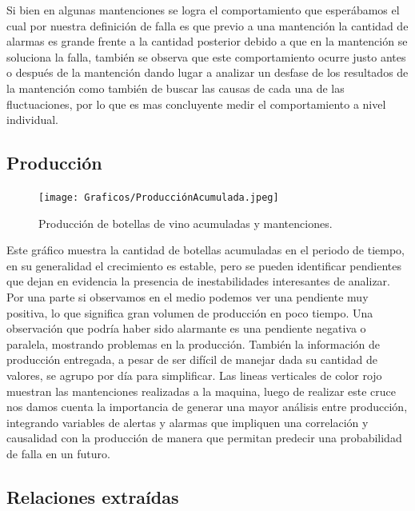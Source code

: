 \documentclass[10pt]{article}
\begin{document}
Si bien en algunas mantenciones se logra el comportamiento que esperábamos el cual por nuestra definición de falla es que previo a una mantención la cantidad de alarmas es grande frente a la cantidad posterior debido a que en la mantención se soluciona la falla, también se observa que este comportamiento ocurre justo antes o después de la mantención dando lugar a analizar un desfase de los resultados de la mantención como también de buscar las causas de cada una de las fluctuaciones, por lo que es mas concluyente medir el comportamiento a nivel individual. 


\subsection{Producción}

\begin{figure}[H]
\texttt{[image: Graficos/ProducciónAcumulada.jpeg]}
\caption{Producción de botellas de vino acumuladas y mantenciones.}
\end{figure}


Este gráfico muestra la cantidad de botellas acumuladas en el periodo de tiempo, en su generalidad el crecimiento es estable, pero se pueden identificar pendientes que dejan en evidencia la presencia de inestabilidades interesantes de analizar. Por una parte si observamos en el medio podemos ver una pendiente muy positiva, lo que significa gran volumen de producción en poco tiempo. Una observación que podría haber sido alarmante es una pendiente negativa o paralela, mostrando problemas en la producción. También la información de producción entregada, a pesar de ser difícil de manejar dada su cantidad de valores, se agrupo por día para simplificar. Las lineas verticales de color rojo muestran las mantenciones realizadas a la maquina, luego de realizar este cruce nos damos cuenta la importancia de generar una mayor análisis entre producción, integrando variables de alertas y alarmas que impliquen una correlación y causalidad con la producción de manera que permitan predecir una probabilidad de falla en un futuro.

\subsection{Relaciones extraídas}
\end{document}
